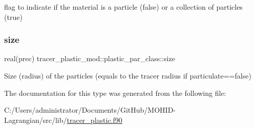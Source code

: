 flag to indicate if the material is a particle (false) or a collection of particles (true) 

\mbox{\label{structtracer__plastic__mod_1_1plastic__par__class_a4436f491c11ebd046b3a74987ff71eee}} 
\subsubsection{\texorpdfstring{size}{size}}
{\footnotesize\ttfamily real(prec) tracer\+\_\+plastic\+\_\+mod\+::plastic\+\_\+par\+\_\+class\+::size\hspace{0.3cm}{\ttfamily [private]}}



Size (radius) of the particles (equals to the tracer radius if particulate==false) 



The documentation for this type was generated from the following file\+:\begin{DoxyCompactItemize}
\item 
C\+:/\+Users/administrator/\+Documents/\+Git\+Hub/\+M\+O\+H\+I\+D-\/\+Lagrangian/src/lib/\hyperlink{tracer__plastic_8f90}{tracer\+\_\+plastic.\+f90}\end{DoxyCompactItemize}
